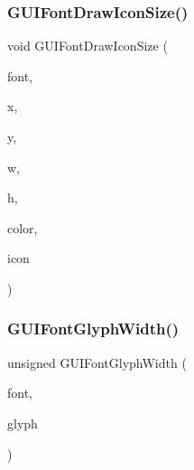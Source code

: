 \mbox{\label{psp2_2gui-font_8c_ae9ac7ef646aad8e77b04baf500472178}} 
\subsubsection{\texorpdfstring{G\+U\+I\+Font\+Draw\+Icon\+Size()}{GUIFontDrawIconSize()}}
{\footnotesize\ttfamily void G\+U\+I\+Font\+Draw\+Icon\+Size (\begin{DoxyParamCaption}\item[{const struct G\+U\+I\+Font $\ast$}]{font,  }\item[{\mbox{\hyperlink{ioapi_8h_a787fa3cf048117ba7123753c1e74fcd6}{int}}}]{x,  }\item[{\mbox{\hyperlink{ioapi_8h_a787fa3cf048117ba7123753c1e74fcd6}{int}}}]{y,  }\item[{\mbox{\hyperlink{ioapi_8h_a787fa3cf048117ba7123753c1e74fcd6}{int}}}]{w,  }\item[{\mbox{\hyperlink{ioapi_8h_a787fa3cf048117ba7123753c1e74fcd6}{int}}}]{h,  }\item[{uint32\+\_\+t}]{color,  }\item[{enum G\+U\+I\+Icon}]{icon }\end{DoxyParamCaption})}

\mbox{\label{psp2_2gui-font_8c_a4b38c72440f93dd3f4c6d01848a23203}} 
\subsubsection{\texorpdfstring{G\+U\+I\+Font\+Glyph\+Width()}{GUIFontGlyphWidth()}}
{\footnotesize\ttfamily unsigned G\+U\+I\+Font\+Glyph\+Width (\begin{DoxyParamCaption}\item[{const struct G\+U\+I\+Font $\ast$}]{font,  }\item[{uint32\+\_\+t}]{glyph }\end{DoxyParamCaption})}

